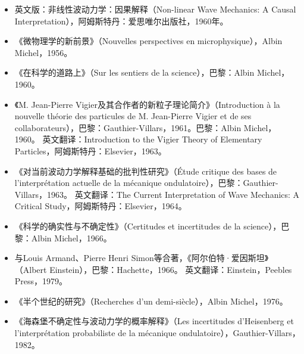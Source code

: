 \begin{itemize}
\item 英文版：非线性波动力学：因果解释（Non-linear Wave Mechanics: A Causal Interpretation），阿姆斯特丹：爱思唯尔出版社，1960年。
\item 《微物理学的新前景》（Nouvelles perspectives en microphysique），Albin Michel，1956。
\item 《在科学的道路上》（Sur les sentiers de la science），巴黎：Albin Michel，1960。
\item 《M. Jean-Pierre Vigier及其合作者的新粒子理论简介》（Introduction à la nouvelle théorie des particules de M. Jean-Pierre Vigier et de ses collaborateurs），巴黎：Gauthier-Villars，1961。巴黎：Albin Michel，1960。
  英文翻译：Introduction to the Vigier Theory of Elementary Particles，阿姆斯特丹：Elsevier，1963。
\item 《对当前波动力学解释基础的批判性研究》（Étude critique des bases de l'interprétation actuelle de la mécanique ondulatoire），巴黎：Gauthier-Villars，1963。
  英文翻译：The Current Interpretation of Wave Mechanics: A Critical Study，阿姆斯特丹：Elsevier，1964。
\item 《科学的确实性与不确定性》（Certitudes et incertitudes de la science），巴黎：Albin Michel，1966。
\item 与Louis Armand、Pierre Henri Simon等合著，《阿尔伯特·爱因斯坦》（Albert Einstein），巴黎：Hachette，1966。
  英文翻译：Einstein，Peebles Press，1979。
\item 《半个世纪的研究》（Recherches d'un demi-siècle），Albin Michel，1976。
\item 《海森堡不确定性与波动力学的概率解释》（Les incertitudes d'Heisenberg et l'interprétation probabiliste de la mécanique ondulatoire），Gauthier-Villars，1982。
\end{itemize}

